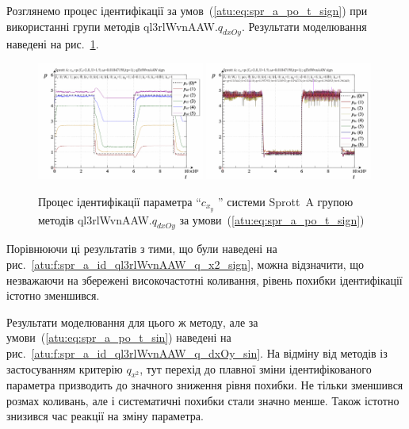 Розглянемо процес ідентифікації за умов~(\ref{atu:eq:spr_a_po_t_sign}) при
використанні групи методів ql3rlWvnAAW.$q_{dxOy} $. Результати моделювання наведені на
рис.~\ref{atu:f:spr_a_id_ql3rlWvnAAW_q_dxOy_sign}.

\begin{figure}[htb!]
  \centerline{
    \includegraphics[width=0.49\textwidth]{p/cha/spr_a/ql3rlWvnAAW_dxOy/sprott_a_id2-p_t_pi_ql3rlWvnAAW_sign.png}
    \hfill
    \includegraphics[width=0.49\textwidth]{p/cha/spr_a/ql3rlWvnAAW_dxOy/sprott_a_id2-p_t_p_ql3rlWvnAAW_sign.png}
  }
\caption{Процес ідентифікації параметра ``$ c_{x_y} $ '' системи Sprott~A групою методів ql3rlWvnAAW.$q_{dxOy} $ за умови~(\ref{atu:eq:spr_a_po_t_sign})}
  \label{atu:f:spr_a_id_ql3rlWvnAAW_q_dxOy_sign}
\end{figure}

Порівнюючи ці результатів з тими, що були наведені на
рис.~\ref{atu:f:spr_a_id_ql3rlWvnAAW_q_x2_sign}, можна відзначити, що незважаючи
на збережені високочастотні коливання, рівень похибки
ідентифікації істотно зменшився.

Результати моделювання для цього ж методу,
але за умови~(\ref{atu:eq:spr_a_po_t_sin}) наведені на
рис.~\ref{atu:f:spr_a_id_ql3rlWvnAAW_q_dxOy_sin}. На відміну від методів із
застосуванням критерію
$ q_{x^2} $, тут перехід до плавної зміни ідентифікованого
параметра призводить до значного зниження рівня похибки. Не
тільки зменшився розмах коливань, але і систематичні похибки
стали значно менше. Також істотно знизився час реакції на
зміну параметра.

